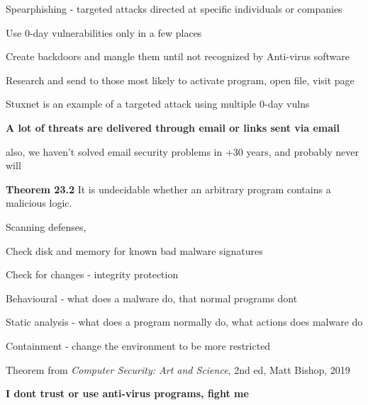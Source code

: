 \documentclass[Screen16to9,17pt]{foils}
\begin{document}


Spearphishing - targeted attacks directed at specific individuals or companies

\begin{list2}
\item Use 0-day vulnerabilities only in a few places
\item Create backdoors and mangle them until not recognized by Anti-virus software
\item Research and send to those most likely to activate program, open file, visit page
\item Stuxnet is an example of a targeted attack using multiple 0-day vulns
\end{list2}

{\bf  A lot of threats are delivered through email or links sent via email}

also, we haven't solved email security problems in +30 years, and probably never will




\begin{list1}
\item {\bf Theorem 23.2} It is undecidable whether an arbitrary program contains a malicious logic.
\item Scanning defenses,
\begin{list2}
\item Check disk and memory for known bad malware signatures
\item Check for changes - integrity protection
\end{list2}
\item Behavioural - what does a malware do, that normal programs dont
\item Static analysis - what does a program normally do, what actions does malware do
\item Containment - change the environment to be more restricted
\item Theorem from \emph{Computer Security: Art and Science}, 2nd ed, Matt Bishop, 2019
\end{list1}

\vskip 1cm
\centerline{\bf \Large I dont trust or use anti-virus programs, fight me}

\end{document}
